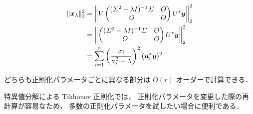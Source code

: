 \begin{align}
    \|\bm{x}_{\lambda}\|_2^2
     & = \left\| V
    \begin{pmatrix}
        (\varSigma^2 + \lambda I)^{-1} \varSigma & O \\
        O                                  & O
    \end{pmatrix}
    U^* \bm{y} \right\|_2^2
    \notag                                                                                          \\
     & = \left\|
    \begin{pmatrix}
        (\varSigma^2 + \lambda I)^{-1} \varSigma & O \\
        O                                  & O
    \end{pmatrix}
    U^* \bm{y} \right\|_2^2
    \notag                                                                                          \\
     & = \sum_{i = 1}^r \left(\frac{\sigma_i}{\sigma_i^2 + \lambda}\right)^2  (\bm{u}_i^* \bm{y})^2
\end{align}

どちらも正則化パラメータごとに異なる部分は $O(r)$ オーダーで計算できる．

特異値分解による Tikhonov 正則化では，
正則化パラメータを変更した際の再計算が容易なため，
多数の正則化パラメータを試したい場合に便利である．
